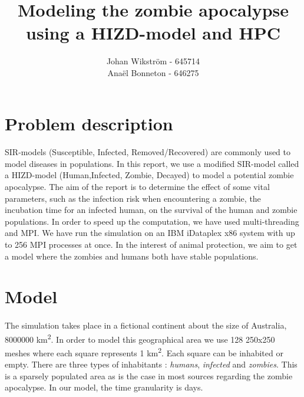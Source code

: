\documentclass{report}
\begin{document}
\title{Modeling the zombie apocalypse using a HIZD-model and HPC}
\author{Johan Wikström - 645714 \\
        Anaël Bonneton - 646275}
\maketitle
\tableofcontents

\newpage

\section{Problem description}	

\paragraph{}
SIR-models (Susceptible, Infected, Removed/Recovered) are commonly used to model diseases in populations. In this report, we use a modified SIR-model called a HIZD-model (Human,Infected, Zombie, Decayed) to model a potential zombie apocalypse. The aim of the report is to determine the effect of some vital parameters, such as the infection risk when encountering a zombie, the incubation time for an infected human, on the survival of the human and zombie populations. In order to speed up the computation, we have used multi-threading and MPI\cite{openmpi}. We have run the simulation on an IBM iDataplex x86 system with up to 256 MPI processes at once. In the interest of animal protection, we aim to get a model where the zombies and humans both have stable populations.

\section{Model}

\paragraph{}
The simulation takes place in a fictional continent about the size of Australia, 8000000 km\textsuperscript{2}. In order to model this geographical area we use 128 250x250 meshes where each square represents 1 km\textsuperscript{2}. Each square can be inhabited or empty. There are three types of inhabitants : \emph{humans}, \emph{infected} and \emph{zombies}. This is a sparsely populated area as is the case in most sources regarding the zombie apocalypse\cite{zombieland}. In our model, the time granularity is days.
\end{document}
